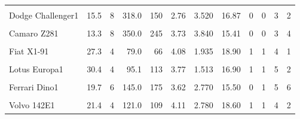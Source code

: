 \documentclass[
  10pt,
]{scrartcl}
\begin{document}
\begin{longtable}[t]{lrrrrrrrrrrr}
\cellcolor{gray!10}{Toyota Corona1} & \cellcolor{gray!10}{21.5} & \cellcolor{gray!10}{4} & \cellcolor{gray!10}{120.1} & \cellcolor{gray!10}{97} & \cellcolor{gray!10}{3.70} & \cellcolor{gray!10}{2.465} & \cellcolor{gray!10}{20.01} & \cellcolor{gray!10}{1} & \cellcolor{gray!10}{0} & \cellcolor{gray!10}{3} & \cellcolor{gray!10}{1}\\
Dodge Challenger1 & 15.5 & 8 & 318.0 & 150 & 2.76 & 3.520 & 16.87 & 0 & 0 & 3 & 2\\
\cellcolor{gray!10}{AMC Javelin1} & \cellcolor{gray!10}{15.2} & \cellcolor{gray!10}{8} & \cellcolor{gray!10}{304.0} & \cellcolor{gray!10}{150} & \cellcolor{gray!10}{3.15} & \cellcolor{gray!10}{3.435} & \cellcolor{gray!10}{17.30} & \cellcolor{gray!10}{0} & \cellcolor{gray!10}{0} & \cellcolor{gray!10}{3} & \cellcolor{gray!10}{2}\\
\addlinespace
Camaro Z281 & 13.3 & 8 & 350.0 & 245 & 3.73 & 3.840 & 15.41 & 0 & 0 & 3 & 4\\
\cellcolor{gray!10}{Pontiac Firebird1} & \cellcolor{gray!10}{19.2} & \cellcolor{gray!10}{8} & \cellcolor{gray!10}{400.0} & \cellcolor{gray!10}{175} & \cellcolor{gray!10}{3.08} & \cellcolor{gray!10}{3.845} & \cellcolor{gray!10}{17.05} & \cellcolor{gray!10}{0} & \cellcolor{gray!10}{0} & \cellcolor{gray!10}{3} & \cellcolor{gray!10}{2}\\
Fiat X1-91 & 27.3 & 4 & 79.0 & 66 & 4.08 & 1.935 & 18.90 & 1 & 1 & 4 & 1\\
\cellcolor{gray!10}{Porsche 914-21} & \cellcolor{gray!10}{26.0} & \cellcolor{gray!10}{4} & \cellcolor{gray!10}{120.3} & \cellcolor{gray!10}{91} & \cellcolor{gray!10}{4.43} & \cellcolor{gray!10}{2.140} & \cellcolor{gray!10}{16.70} & \cellcolor{gray!10}{0} & \cellcolor{gray!10}{1} & \cellcolor{gray!10}{5} & \cellcolor{gray!10}{2}\\
Lotus Europa1 & 30.4 & 4 & 95.1 & 113 & 3.77 & 1.513 & 16.90 & 1 & 1 & 5 & 2\\
\addlinespace
\cellcolor{gray!10}{Ford Pantera L1} & \cellcolor{gray!10}{15.8} & \cellcolor{gray!10}{8} & \cellcolor{gray!10}{351.0} & \cellcolor{gray!10}{264} & \cellcolor{gray!10}{4.22} & \cellcolor{gray!10}{3.170} & \cellcolor{gray!10}{14.50} & \cellcolor{gray!10}{0} & \cellcolor{gray!10}{1} & \cellcolor{gray!10}{5} & \cellcolor{gray!10}{4}\\
Ferrari Dino1 & 19.7 & 6 & 145.0 & 175 & 3.62 & 2.770 & 15.50 & 0 & 1 & 5 & 6\\
\cellcolor{gray!10}{Maserati Bora1} & \cellcolor{gray!10}{15.0} & \cellcolor{gray!10}{8} & \cellcolor{gray!10}{301.0} & \cellcolor{gray!10}{335} & \cellcolor{gray!10}{3.54} & \cellcolor{gray!10}{3.570} & \cellcolor{gray!10}{14.60} & \cellcolor{gray!10}{0} & \cellcolor{gray!10}{1} & \cellcolor{gray!10}{5} & \cellcolor{gray!10}{8}\\
Volvo 142E1 & 21.4 & 4 & 121.0 & 109 & 4.11 & 2.780 & 18.60 & 1 & 1 & 4 & 2\\*

\end{longtable}
\end{document}

